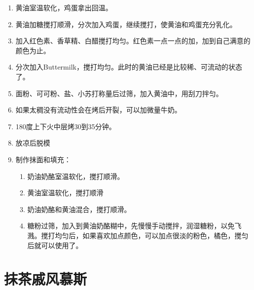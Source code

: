 \begin{enumerate}
    \item 黄油室温软化，鸡蛋拿出回温。
    \item 黄油加糖搅打顺滑，分次加入鸡蛋，继续搅打，使黄油和鸡蛋充分乳化。
    \item 加入红色素、香草精、白醋搅打均匀。红色素一点一点的加，加到自己满意的颜色为止。
    \item 分次加入Buttermilk，搅打均匀。此时的黄油已经是比较稀、可流动的状态了。
    \item 面粉、可可粉、盐、小苏打称量后过筛，加入黄油中，用刮刀拌匀。
    \item 如果太稠没有流动性会在烤后开裂，可以加微量牛奶。
    \item 180度上下火中层烤30到35分钟。
    \item 放凉后脱模
    \item 制作抹面和填充：
    \begin{enumerate}
    \item 奶油奶酪室温软化，搅打顺滑。
    \item 黄油室温软化，搅打顺滑
    \item 奶油奶酪和黄油混合，搅打顺滑。
    \item 糖粉过筛，加入到黄油奶酪糊中，先慢慢手动搅拌，润湿糖粉，以免飞溅。搅打均匀后，如果喜欢加点颜色，可以加点很淡的粉色，橘色，搅匀后就可以使用了。
    \end{enumerate}
\end{enumerate}

\section{抹茶戚风慕斯}

